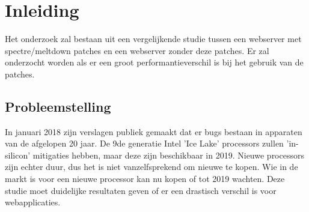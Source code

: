 
\chapter*{Inleiding}
\label{ch:inleiding}


Het onderzoek zal bestaan uit een vergelijkende studie tussen een webserver met spectre/meltdown patches en een webserver zonder deze patches.
Er zal onderzocht worden als er een groot performantieverschil is bij het gebruik van de patches.


\section{Probleemstelling}
\label{sec:probleemstelling}

In januari 2018 zijn verslagen publiek gemaakt dat er bugs bestaan in apparaten van de afgelopen 20 jaar. De 9de generatie Intel 'Ice Lake' processors zullen 'in-silicon' mitigaties hebben, maar deze zijn beschikbaar in 2019.
Nieuwe processors zijn echter duur, dus het is niet vanzelfsprekend om nieuwe te kopen.
Wie in de markt is voor een nieuwe processor kan nu kopen of tot 2019 wachten.
Deze studie moet duidelijke resultaten geven of er een drastisch verschil is voor webapplicaties.


